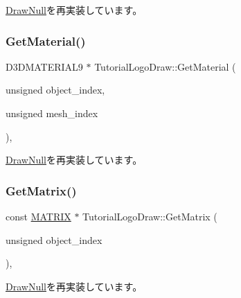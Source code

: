 \mbox{\hyperlink{class_draw_null_a8496ed1b1f765a331a8f1704122b8ca4}{Draw\+Null}}を再実装しています。

\mbox{\label{class_tutorial_logo_draw_a3a97860361e32a727246e99052715f37}} 
\subsubsection{\texorpdfstring{Get\+Material()}{GetMaterial()}}
{\footnotesize\ttfamily D3\+D\+M\+A\+T\+E\+R\+I\+A\+L9 $\ast$ Tutorial\+Logo\+Draw\+::\+Get\+Material (\begin{DoxyParamCaption}\item[{unsigned}]{object\+\_\+index,  }\item[{unsigned}]{mesh\+\_\+index }\end{DoxyParamCaption})\hspace{0.3cm}{\ttfamily [override]}, {\ttfamily [virtual]}}



\mbox{\hyperlink{class_draw_null_a84969d22d3436986f214e9896fe44fc6}{Draw\+Null}}を再実装しています。

\mbox{\label{class_tutorial_logo_draw_ab700e592d00574dff6ee342138343d7b}} 
\subsubsection{\texorpdfstring{Get\+Matrix()}{GetMatrix()}}
{\footnotesize\ttfamily const \mbox{\hyperlink{_vector3_d_8h_a032295cd9fb1b711757c90667278e744}{M\+A\+T\+R\+IX}} $\ast$ Tutorial\+Logo\+Draw\+::\+Get\+Matrix (\begin{DoxyParamCaption}\item[{unsigned}]{object\+\_\+index }\end{DoxyParamCaption})\hspace{0.3cm}{\ttfamily [override]}, {\ttfamily [virtual]}}



\mbox{\hyperlink{class_draw_null_adede079e9c11a756090740b20bb43022}{Draw\+Null}}を再実装しています。

\mbox{\label{class_tutorial_logo_draw_a19de254c5460e3728d7c79243fd65e6f}} 
